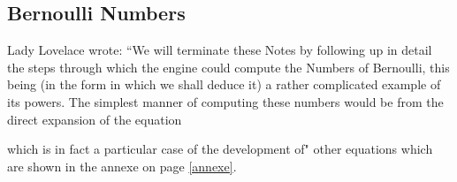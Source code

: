 \documentclass[12pt, xcolor=dvipsnames]{beamer}
\begin{document}
\subsection{Bernoulli Numbers}

\begin{frame}
\begin{center} 
{\bf \subsecname} 
\end{center}

Lady Lovelace wrote: ``We will terminate these Notes by following up in detail the steps through which the engine could compute the Numbers of Bernoulli, this being (in the form in which we shall deduce it) a rather complicated example of its powers. The simplest manner of computing these numbers would be from the direct expansion of the equation 


\noindent which is in fact a particular case of the development of" other equations which are shown in the annexe on page \ref{annexe}. \cite{ada}

\end{frame}
\end{document}
